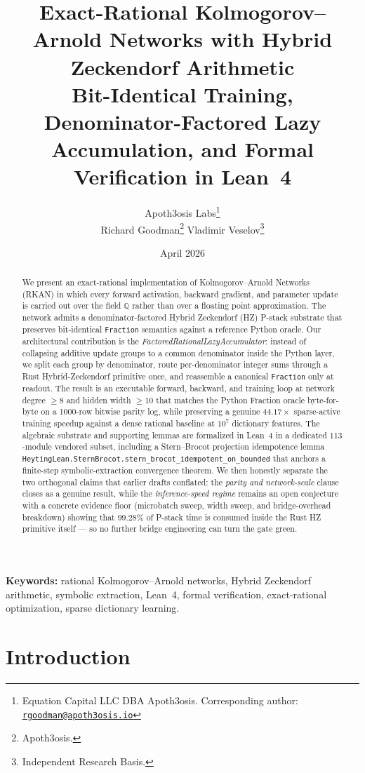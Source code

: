 \documentclass[11pt,a4paper]{article}
\title{\vspace{-0.5cm}\textbf{Exact-Rational Kolmogorov--Arnold Networks with Hybrid Zeckendorf Arithmetic}\\[0.3em]
\large Bit-Identical Training, Denominator-Factored Lazy Accumulation, and Formal Verification in Lean~4}
\author{
  Apoth3osis Labs\thanks{Equation Capital LLC DBA Apoth3osis. Corresponding author: \href{mailto:rgoodman@apoth3osis.io}{\texttt{rgoodman@apoth3osis.io}}}\\[0.2em]
  Richard Goodman\thanks{Apoth3osis.}\quad
  Vladimir Veselov\thanks{Independent Research Basis.}
}
\date{April 2026}
\begin{document}
\maketitle

\begin{abstract}
\noindent
We present an exact-rational implementation of Kolmogorov--Arnold Networks
(RKAN) in which every forward activation, backward gradient, and parameter
update is carried out over the field $\mathbb{Q}$ rather than over a floating
point approximation. The network admits a denominator-factored Hybrid
Zeckendorf (HZ) P-stack substrate that preserves bit-identical \texttt{Fraction}
semantics against a reference Python oracle. Our architectural contribution is
the \emph{FactoredRationalLazyAccumulator}: instead of collapsing additive
update groups to a common denominator inside the Python layer, we split each
group by denominator, route per-denominator integer sums through a Rust
Hybrid-Zeckendorf primitive once, and reassemble a canonical
\texttt{Fraction} only at readout. The result is an executable forward,
backward, and training loop at network degree $\geq 8$ and hidden width
$\geq 10$ that matches the Python Fraction oracle byte-for-byte on a
1000-row bitwise parity log, while preserving a genuine $44.17{\times}$
sparse-active training speedup against a dense rational baseline at $10^{7}$
dictionary features. The algebraic substrate and supporting lemmas are
formalized in Lean~4 in a dedicated $113$-module vendored subset, including a
Stern--Brocot projection idempotence lemma
\texttt{HeytingLean.SternBrocot.stern\_brocot\_idempotent\_on\_bounded} that
anchors a finite-step symbolic-extraction convergence theorem. We then honestly
separate the two orthogonal claims that earlier drafts conflated: the
\emph{parity and network-scale} clause closes as a genuine result, while the
\emph{inference-speed regime} remains an open conjecture with a concrete
evidence floor (microbatch sweep, width sweep, and bridge-overhead breakdown)
showing that $99.28\%$ of P-stack time is consumed inside the Rust HZ primitive
itself --- so no further bridge engineering can turn the gate green.
\end{abstract}

\vspace{-0.3em}
\noindent\textbf{Keywords:} rational Kolmogorov--Arnold networks,
Hybrid Zeckendorf arithmetic, symbolic extraction, Lean~4, formal verification,
exact-rational optimization, sparse dictionary learning.

\section{Introduction}
\label{sec:intro}
\end{document}
